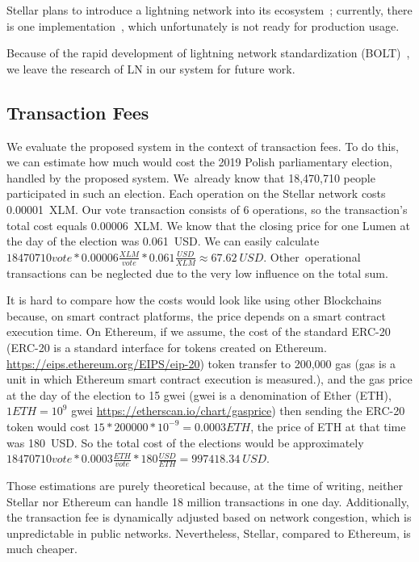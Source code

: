 \documentclass[applsci,article,accept,moreauthors,pdftex]{Definitions/mdpi}
\begin{document}
Stellar plans to introduce a lightning network into its ecosystem~\cite{Lightnin14:online}; currently, there is one implementation~\cite{interste55:online}, which unfortunately is not ready for production usage. 

Because of the rapid development of lightning network standardization (BOLT)~\cite{poon2016bitcoin}, we leave the research of LN in our system for future work. 

\subsection{Transaction Fees}
We evaluate the proposed system in the context of transaction fees. To do this, we can estimate how much would cost the 2019 Polish parliamentary election, handled by the proposed system. We~already know that 18,470,710 %
people participated in such an election. Each operation on the Stellar network costs 0.00001~XLM. Our vote transaction consists of 6 operations, so the transaction's total cost equals 0.00006~XLM. %
We know that the closing price for one Lumen at the day of the election was 0.061~USD.%
We can easily calculate \(18470710 vote * 0.00006 \frac{XLM}{vote} * 0.061 \frac{USD}{XLM} \approx 67.62~USD\). Other~operational transactions can be neglected due to the very low influence on the total sum.%

It is hard to compare how the costs would look like using other Blockchains because, on smart contract platforms, the price depends on a smart contract execution time. On Ethereum, if we assume, the cost of the standard ERC-20 ({ERC-20 is a standard interface for tokens created on Ethereum.} \url{ https://eips.ethereum.org/EIPS/eip-20}) token transfer to 200,000 gas ({gas is a unit in which Ethereum smart contract execution is measured.}), and the gas price at the day of the election to 15 gwei ({gwei is a denomination of Ether (ETH),} $1 ETH = 10^{9}$ gwei \url{https://etherscan.io/chart/gasprice}) then sending the ERC-20 token would cost $15 * 200000 * 10^{-9} = 0.0003 ETH$, the price of ETH at that time was 180~USD. So the total cost of the elections would be approximately \(18470710 vote * 0.0003 \frac{ETH}{vote} * 180 \frac{USD}{ETH} = 99 7418.34~USD\). 

Those estimations are purely theoretical because, at the time of writing, neither Stellar nor Ethereum can handle 18 million transactions in one day. Additionally, the transaction fee is dynamically adjusted based on network congestion, which is unpredictable in public networks. Nevertheless, Stellar, compared to Ethereum, is much cheaper.
\end{document}
